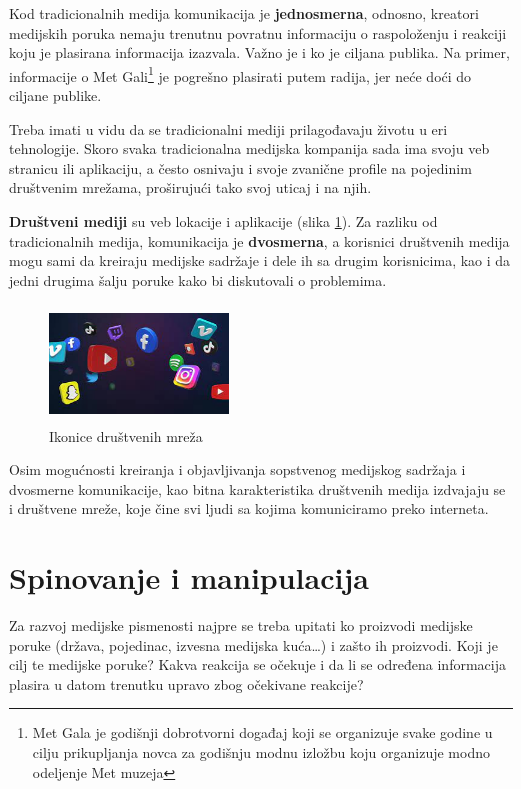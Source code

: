 \documentclass[a4paper]{article}
\begin{document}
Kod tradicionalnih medija komunikacija je \textbf{jednosmerna}, odnosno, kreatori medijskih poruka nemaju trenutnu povratnu informaciju o raspoloženju i reakciji koju je plasirana informacija izazvala. Važno je i ko je ciljana publika. Na primer, informacije o Met Gali\footnote{Met Gala je godišnji dobrotvorni događaj koji se organizuje svake godine u cilju prikupljanja novca za godišnju modnu izložbu koju organizuje modno odeljenje Met muzeja } je pogrešno plasirati putem radija, jer neće doći do ciljane publike.

	
Treba imati u vidu da se tradicionalni mediji prilagođavaju životu u eri tehnologije. Skoro svaka tradicionalna medijska kompanija sada ima svoju veb stranicu ili aplikaciju, a često osnivaju i svoje zvanične profile na pojedinim društvenim mrežama, proširujući tako svoj uticaj i na njih.

	
	\textbf{Društveni mediji} su veb lokacije i aplikacije (slika \ref{fig:icons}). Za
	razliku od tradicionalnih medija, komunikacija je \textbf{dvosmerna}, a korisnici
	društvenih medija mogu sami da kreiraju medijske sadržaje i dele ih sa
	drugim korisnicima, kao i da jedni drugima šalju poruke kako bi
	diskutovali o problemima.
 
	\begin{figure}[ht!]
	\begin{center}
		\includegraphics[width=1.87842in,height=1.225in]{slika4.jpg}
	\end{center}
	\caption {Ikonice društvenih mreža}
	\label{fig:icons}
	
	
\end{figure}
	
	Osim mogućnosti kreiranja i objavljivanja sopstvenog medijskog sadržaja i dvosmerne komunikacije, kao bitna karakteristika društvenih medija izdvajaju se i društvene mreže, koje čine svi ljudi sa kojima komuniciramo preko interneta. 


\section{Spinovanje i manipulacija}
\label{sec:naslov2}

Za razvoj medijske pismenosti najpre se treba upitati ko proizvodi medijske poruke (država, pojedinac, izvesna medijska kuća…) i zašto ih proizvodi. Koji je cilj te medijske poruke? Kakva reakcija se očekuje i da li se određena informacija plasira u datom trenutku upravo zbog očekivane reakcije? 
\end{document}
